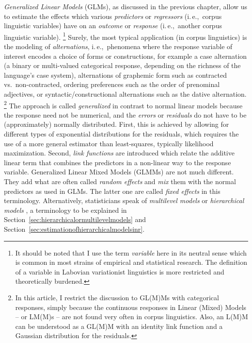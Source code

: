 \documentclass[a4paper,12pt]{article}
\newcommand{\ie}{i.\,e.,\ }
\begin{document}
\textit{Generalized Linear Models} (GLMs), as discussed in the previous chapter, allow us to estimate the effects which various \textit{predictors} or \textit{regressors} (\ie corpus linguistic variables) have on an \textit{outcome} or \textit{response} (\ie another corpus linguistic variable).%
\footnote{It should be noted that I use the term \textit{variable} here in its neutral sense which is common in most strains of empirical and statistical research.
The definition of a variable in Labovian variationist linguistics is more restricted and theoretically burdened.}
Surely, the most typical application (in corpus linguistics) is the modeling of \textit{alternations}, \ie phenomena where the response variable of interest encodes a choice of forms or constructions, for example a case alternation (a binary or multi-valued categorical response, depending on the richness of the language's case system), alternations of graphemic form such as contracted vs.\ non-contracted, ordering preferences such as the order of prenominal adjectives, or syntactic\slash constructional alternations such as the dative alternation.%
\footnote{In this article, I restrict the discussion to GL(M)Ms with categorical responses, simply because the continuous responses in Linear (Mixed) Models -- or LM(M)s – are not found very often in corpus linguistics.
Also, an L(M)M can be understood as a GL(M)M with an identity link function and a Gaussian distribution for the residuals.}
The approach is called \textit{generalized} in contrast to normal linear models because the response need not be numerical, and the \textit{errors} or \textit{residuals} do not have to be (approximately) normally distributed.
First, this is achieved by allowing for different types of exponential distributions for the residuals, which requires the use of a more general estimator than least-squares, typically likelihood maximization.
Second, \textit{link functions} are introduced which relate the additive linear term that combines the predictors in a non-linear way to the response variable.
Generalized Linear Mixed Models (GLMMs) are not much different.
They add what are often called \textit{random effects} and \textit{mix} them with the normal predictors as used in GLMs.
The latter one are called \textit{fixed effects} in this terminology.
Alternatively, statisticians speak of \textit{multilevel models} or \textit{hierarchical models} \citep{GelmanHill2006}, a terminology to be explained in Section~\ref{sec:hierarchicalormultilevelmodels} and Section~\ref{sec:estimationofhierarchicalmodelsinr}.
\end{document}
